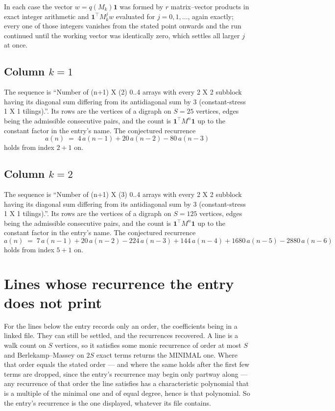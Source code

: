 \documentclass[11pt,a4paper]{article}
\theoremstyle{plain}
\theoremstyle{definition}
\begin{document}
In each case the vector $w=q(M_k)\mathbf{1}$ was formed by $r$ matrix--vector products in
exact integer arithmetic and $\mathbf{1}^{\!\top}M_k^{j}w$ evaluated for $j=0,1,\dots$,
again exactly; every one of those integers vanishes from the stated point onwards and the run
continued until the working vector was identically zero, which settles all larger $j$ at once.

\subsection*{Column $k$$=1$}
The sequence is ``Number of (n+1) X (2) 0..4 arrays with every 2 X 2 subblock having its diagonal sum differing from its antidiagonal sum by 3 (constant-stress 1 X 1 tilings).''. Its rows are the vertices of a digraph on
$S=25$ vertices, edges being the admissible consecutive pairs, and the count is
$\mathbf{1}^{\!\top}M^{n}\mathbf{1}$ up to the constant factor in the entry's name.
The conjectured recurrence
\[
a(n)\;=\;4\,a(n-1) + 20\,a(n-2) - 80\,a(n-3)
\]
holds from index $2+1$ on.

\subsection*{Column $k$$=2$}
The sequence is ``Number of (n+1) X (3) 0..4 arrays with every 2 X 2 subblock having its diagonal sum differing from its antidiagonal sum by 3 (constant-stress 1 X 1 tilings).''. Its rows are the vertices of a digraph on
$S=125$ vertices, edges being the admissible consecutive pairs, and the count is
$\mathbf{1}^{\!\top}M^{n}\mathbf{1}$ up to the constant factor in the entry's name.
The conjectured recurrence
\[
a(n)\;=\;7\,a(n-1) + 20\,a(n-2) - 224\,a(n-3) + 144\,a(n-4) + 1680\,a(n-5) - 2880\,a(n-6)
\]
holds from index $5+1$ on.


\section{Lines whose recurrence the entry does not print}

For the lines below the entry records only an order, the coefficients being in a linked file.
They can still be settled, and the recurrences recovered. A line is a walk count on $S$
vertices, so it satisfies some monic recurrence of order at most $S$ and Berlekamp--Massey on
$2S$ exact terms returns the MINIMAL one. Where that order equals the stated order --- and
where the same holds after the first few terms are dropped, since the entry's recurrence may
begin only partway along --- any recurrence of that order the line satisfies has a
characteristic polynomial that is a multiple of the minimal one and of equal degree, hence is
that polynomial. So the entry's recurrence is the one displayed, whatever its file contains.
\end{document}
